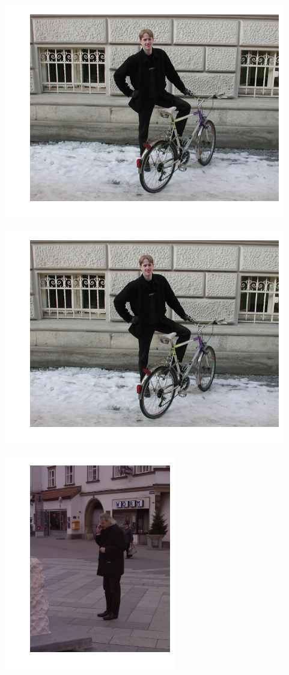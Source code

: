 \includegraphics{facedetection_files/facedetection_62_6.png}

\includegraphics{facedetection_files/facedetection_62_7.png}

\includegraphics{facedetection_files/facedetection_62_8.png}

